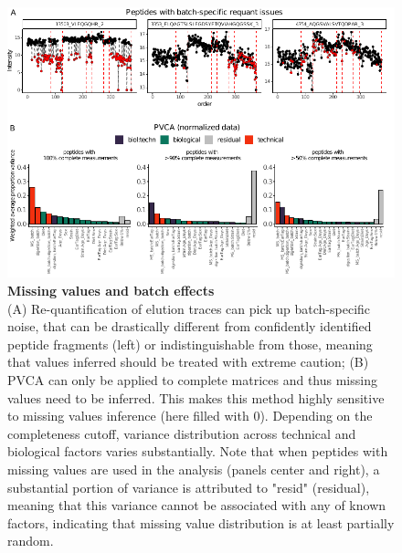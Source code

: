 \documentclass[num-refs]{wiley-article}
\begin{document}
\begin{figure}
	\includegraphics[width=\textwidth]{figures/Supp_Fig4_missing_values_extra.pdf}
	
	\caption{\textbf{Missing values and batch effects} \\
		\footnotesize (A) Re-quantification of elution traces can pick up batch-specific noise, that can be drastically different from confidently identified peptide fragments (left) or indistinguishable from those, meaning that values inferred should be treated with extreme caution; (B) PVCA can only be applied to complete matrices and thus missing values need to be inferred. This makes this method highly sensitive to missing values inference (here filled with 0). Depending on the completeness cutoff, variance distribution across technical and biological factors varies substantially. Note that when peptides with missing values are used in the analysis (panels center and right), a substantial portion of variance is attributed to "resid" (residual), meaning that this variance cannot be associated with any of known factors, indicating that missing value distribution is at least partially random.}
	\label{fig:batch_figS4_missing_values}
\end{figure}
\end{document}
